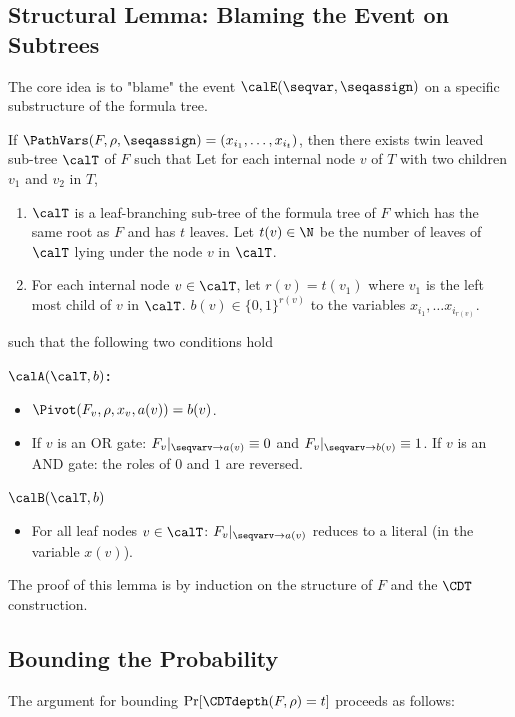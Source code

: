 \subsection{Structural Lemma: Blaming the Event on Subtrees}
\label{sec:structural-lemma-proof}
The core idea is to "blame" the event $\calE(\seqvar,\seqassign)$ on a specific substructure of the formula tree.

\begin{lemma}
\label{lem:structural_lemma}
    If $\PathVars(F,\rho, \seqassign) = (x_{i_1}, \dots , x_{i_t})$, then there exists twin leaved sub-tree $\calT$ of $F$ such that 
Let for each internal node $v$ of $T$ with two children $v_1$ and $v_2$ in $T$, 
    \begin{enumerate}
        \item $\calT$ is a leaf-branching sub-tree of the formula tree of $F$ which has the same root as $F$ and has $t$ leaves. Let $t(v) \in \N$ be the number of leaves of $\calT$ lying under the node $v$ in $\calT$.
        \item For each internal node $v \in \calT$, let $r(v) = t(v_1)$ where $v_1$ is the left most child of $v$ in $\calT$.  $b(v) \in \{0,1\}^{r(v)}$  to the variables $x_{i_1}, \dots x_{i_{r(v)}}$. 
    \end{enumerate}
    such that the following two conditions hold
    
    \bf $\calA(\calT,b)$: 
            \begin{itemize}
                \item $\Pivot(F_v, \rho, x_v, a(v)) = b(v)$. 
                \item If $v$ is an OR gate: $F_v|_{\seqvarv \to a(v)}\equiv 0$ and $F_v|_{\seqvarv \to b(v)} \equiv 1$. If $v$ is an AND gate: the roles of $0$ and $1$ are reversed.
            \end{itemize}
        \bf $\calB(\calT,b)$
        \begin{itemize}
                \item For all leaf nodes $v \in \calT$: $F_v|_{\seqvarv \to a(v)}$ reduces to a literal (in the variable $x(v)$).
            \end{itemize}
\end{lemma}

The proof of this lemma is by induction on the structure of $F$ and the $\CDT$ construction.

\subsection{Bounding the Probability}
The argument for bounding $\Pr[\CDTdepth(F,\rho) = t]$ proceeds as follows:

